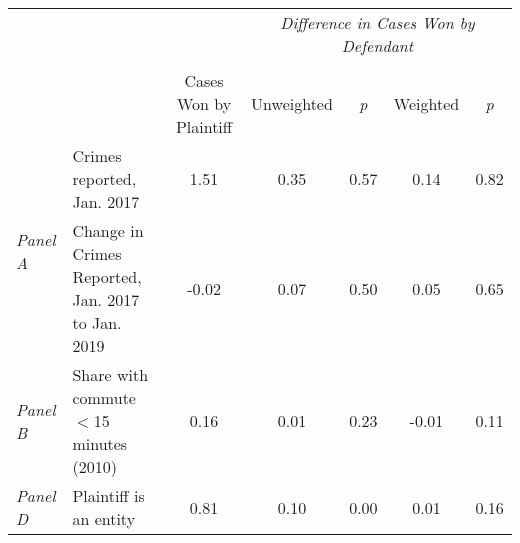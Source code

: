 \begin{tabular}{llccccc}
\toprule
 &  & \textit{} & \multicolumn{4}{c}{\textit{Difference in Cases Won by Defendant}} \\
\cline{4-7}
\\
 &  & Cases Won by Plaintiff & Unweighted & \emph{p} & Weighted & \emph{p} \\
\midrule
\multirow[c]{2}{3cm}{\textit{Panel A}} & Crimes reported, Jan. 2017 & 1.51 & 0.35 & 0.57 & 0.14 & 0.82 \\
 & Change in Crimes Reported, Jan. 2017 to Jan. 2019 & -0.02 & 0.07 & 0.50 & 0.05 & 0.65 \\
\cline{1-7}
\textit{Panel B} & Share with commute $<$15 minutes (2010) & 0.16 & 0.01 & 0.23 & -0.01 & 0.11 \\
\cline{1-7}
\textit{Panel D} & Plaintiff is an entity & 0.81 & 0.10 & 0.00 & 0.01 & 0.16 \\
\cline{1-7}
\bottomrule
\end{tabular}
